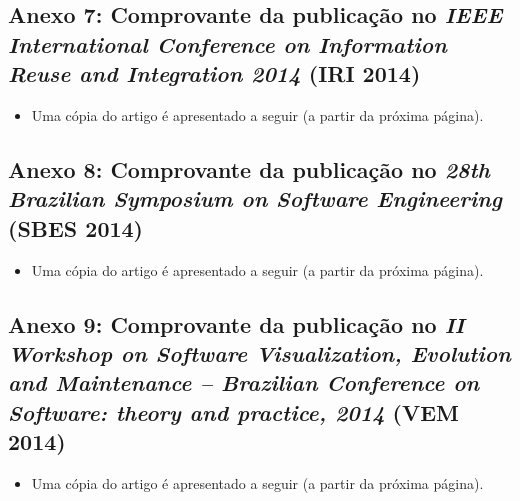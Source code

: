 
\subsection*{Anexo 7: Comprovante da publicação no \emph{IEEE International Conference on Information Reuse and Integration 2014} (IRI 2014)} \label{anexo:comprovante_IRI_Rafael_map}

\begin{itemize}
	\item Uma cópia do artigo é apresentado a seguir (a partir da próxima página).
\end{itemize}
\clearpage



\subsection*{Anexo 8: Comprovante da publicação no \emph{28th Brazilian Symposium on Software Engineering } (SBES 2014)} \label{anexo:comprovante_SBES_Marinho}

\begin{itemize}
	\item Uma cópia do artigo é apresentado a seguir (a partir da próxima página).
\end{itemize}
\clearpage



\subsection*{Anexo 9: Comprovante da publicação no \emph{II Workshop on Software Visualization, Evolution and Maintenance -- Brazilian Conference on Software: theory and practice, 2014 } (VEM 2014)} \label{anexo:comprovante_VEM}

\begin{itemize}
	\item Uma cópia do artigo é apresentado a seguir (a partir da próxima página).
\end{itemize}
\clearpage


